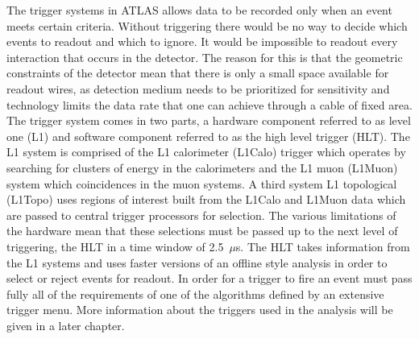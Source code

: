 The trigger systems in ATLAS allows data to be recorded only when an event meets
certain criteria. Without triggering there would be no way to decide which
events to readout and which to ignore. It would be impossible to readout every
interaction that occurs in the detector. The reason for this is that the
geometric constraints of the detector mean that there is only a small space
available for readout wires, as detection medium needs to be prioritized for
sensitivity and technology limits the data rate that one can achieve through a
cable of fixed area. The trigger system comes in two parts, a hardware component
referred to as level one (L1) and software component referred to as the high
level trigger (HLT). The L1 system is comprised of the L1 calorimeter (L1Calo)
trigger which operates by searching for clusters of energy in the calorimeters
and the L1 muon (L1Muon) system which coincidences in the muon systems. A third
system L1 topological (L1Topo) uses regions of interest built from the L1Calo
and L1Muon data which are passed to central trigger processors for selection.
The various limitations of the hardware mean that these selections must be
passed up to the next level of triggering, the HLT in a time window of
2.5~$\mu$s. The HLT takes information from the L1 systems and uses faster
versions of an offline style analysis in order to select or reject events for
readout. In order for a  trigger to fire an event must pass fully all of the
requirements of one of the algorithms defined by an extensive trigger menu. More
information about the triggers used in the \VHbb analysis will be given in a
later chapter.
